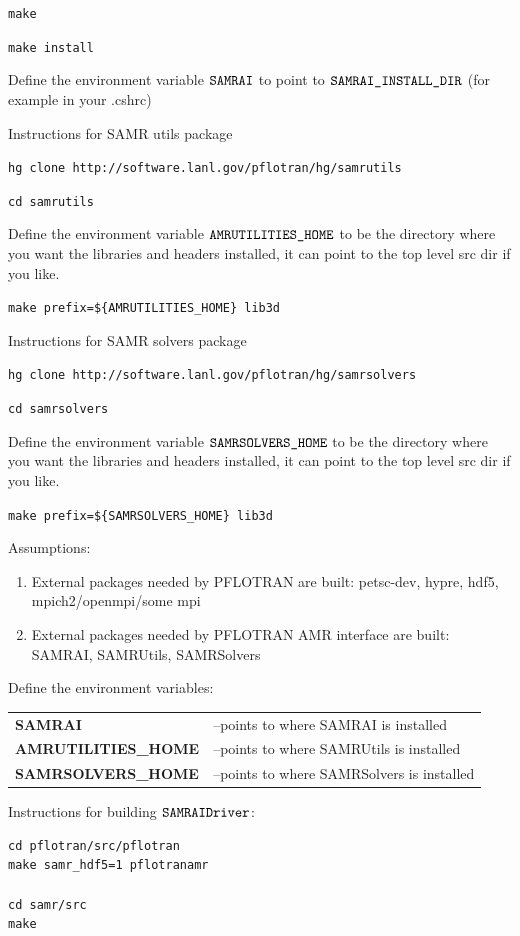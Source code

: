 \documentclass[12pt]{article}
\begin{document}
{\tt make}

{\tt make install}

Define the environment variable $\verb|SAMRAI|$ to point to $\verb|SAMRAI_INSTALL_DIR|$ (for example in your .cshrc)

Instructions for SAMR utils package

{\tt hg clone  http://software.lanl.gov/pflotran/hg/samrutils}

{\tt cd samrutils}

Define the environment variable $\verb|AMRUTILITIES_HOME|$ to be the directory where you want the libraries and headers installed, it can point to the top level src dir if you like.

\verb|make prefix=${AMRUTILITIES_HOME} lib3d|

Instructions for SAMR solvers package

{\tt hg clone  http://software.lanl.gov/pflotran/hg/samrsolvers}

{\tt cd samrsolvers}

Define the environment variable $\verb|SAMRSOLVERS_HOME|$ to be the directory where you want the libraries and headers installed, it can point to the top level src dir if you like.

\verb|make prefix=${SAMRSOLVERS_HOME} lib3d|

\noindent
Assumptions:
\begin{enumerate}
\item External packages needed by PFLOTRAN are built: petsc-dev, hypre,  
hdf5, \linebreak mpich2/openmpi/some mpi
\item External packages needed by PFLOTRAN AMR interface are built:  
SAMRAI, SAMRUtils, SAMRSolvers
\end{enumerate}

\noindent
Define the environment variables:
\begin{center}
\begin{tabularx}{\linewidth}{lX}
\bf SAMRAI &--points to where SAMRAI is installed\\
\bf AMRUTILITIES\_HOME &--points to where SAMRUtils is installed\\
\bf SAMRSOLVERS\_HOME &--points to where SAMRSolvers is installed
\end{tabularx}
\end{center}

\noindent
Instructions for building $\verb|SAMRAIDriver|$:
\begin{center}
\begin{verbatim}
cd pflotran/src/pflotran
make samr_hdf5=1 pflotranamr

cd samr/src
make
\end{verbatim}
\end{center}
\end{document}
